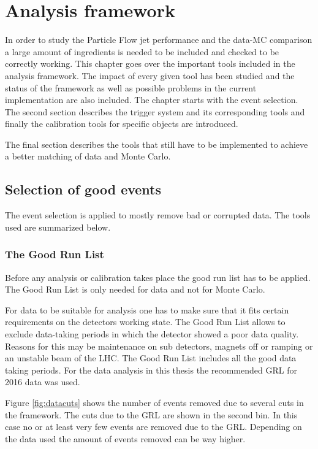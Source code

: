 \chapter{Analysis framework}

In order to study the Particle Flow jet performance and the data-MC comparison a large amount of ingredients is needed to be included and checked to be correctly working. This chapter goes over the important tools included in the analysis framework. The impact of every given tool has been studied and the status of the framework as well as possible problems in the current implementation are also included.
The chapter starts with the event selection. The second section describes the trigger system and its corresponding tools and finally the calibration tools for specific objects are introduced.

The final section describes the tools that still have to be implemented to achieve a better matching of data and Monte Carlo.




\section{Selection of good events}

The event selection is applied to mostly remove bad or corrupted data. The tools used are summarized below.

\subsection{The Good Run List}

Before any analysis or calibration takes place the good run list has to be applied. The Good Run List is only needed for data and not for Monte Carlo.

For data to be suitable for analysis one has to make sure that it fits certain requirements on the detectors working state. The Good Run List allows to exclude data-taking periods in which the detector showed a poor data quality. Reasons for this may be maintenance on sub detectors, magnets off or ramping or an unstable beam of the LHC.
The Good Run List includes all the good data taking periods.
For the data analysis in this thesis the recommended GRL for 2016 data was used.

Figure \ref{fig:datacuts} shows the number of events removed due to several cuts in the framework. The cuts due to the GRL are shown in the second bin. In this case no or at least very few events are removed due to the GRL. Depending on the data used the amount of events removed can be way higher.


